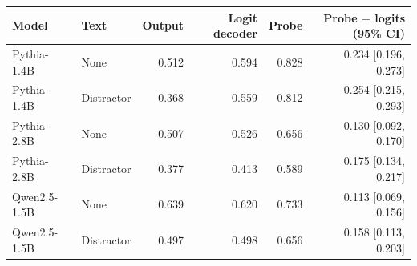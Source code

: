 \begin{tabular}{@{}llrrrr@{}}
\toprule
Model & Text & Output & Logit decoder & Probe & Probe $-$ logits (95\% CI) \\
\midrule
Pythia-1.4B & None & 0.512 & 0.594 & 0.828 & 0.234 [0.196, 0.273] \\
Pythia-1.4B & Distractor & 0.368 & 0.559 & 0.812 & 0.254 [0.215, 0.293] \\
Pythia-2.8B & None & 0.507 & 0.526 & 0.656 & 0.130 [0.092, 0.170] \\
Pythia-2.8B & Distractor & 0.377 & 0.413 & 0.589 & 0.175 [0.134, 0.217] \\
Qwen2.5-1.5B & None & 0.639 & 0.620 & 0.733 & 0.113 [0.069, 0.156] \\
Qwen2.5-1.5B & Distractor & 0.497 & 0.498 & 0.656 & 0.158 [0.113, 0.203] \\
\bottomrule
\end{tabular}
